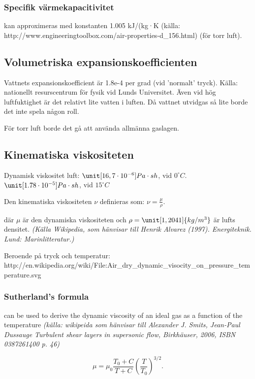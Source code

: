 \subsubsection{Specifik värmekapacitivitet}
kan approximeras med konstanten 1.005 kJ/(kg·K (källa: http://www.engineeringtoolbox.com/air-properties-d\_156.html) (för torr luft).

\subsection{Volumetriska expansionskoefficienten} %
Vattnets expansionskoefficient är 1.8e-4 per grad (vid 'normalt' tryck). Källa: nationellt resurscentrum för fysik vid Lunds Universitet. Även vid hög luftfuktighet är det relativt lite vatten i luften. Då vattnet utvidgas så lite borde det inte spela någon roll.

För torr luft borde det gå att använda allmänna gaslagen.

\subsection{Kinematiska viskositeten} %
Dynamisk viskositet luft: $\unit[16,7\cdot10^{-6}]{Pa\cdot sh}$, vid $0^\circ C$.
$\unit[1.78\cdot10^{-5}]{Pa\cdot sh}$, vid $15^\circ C$

Den kinematiska viskositeten $\nu$ definieras som: $\nu = \frac {\mu} {\rho}.$

där $\mu$ är den dynamiska viskositeten och $\rho=\unit[1,2041]{kg/m^3}$ är lufts densitet. \emph{(Källa Wikipedia, som hänvisar till Henrik Alvarez (1997). Energiteknik. Lund: Marinlitteratur.)}

Beroende på tryck och temperatur: http://en.wikipedia.org/wiki/File:Air\_dry\_dynamic\_visocity\_on\_pressure\_temperature.svg

\subsubsection{Sutherland's formula}
can be used to derive the dynamic viscosity of an ideal gas as a function of the temperature \emph{(källa: wikipeida som hänvisar till Alexander J. Smits, Jean-Paul Dussauge Turbulent shear layers in supersonic flow, Birkhäuser, 2006, ISBN 0387261400 p. 46)}

\begin{equation}
{\mu} = {\mu}_0 \frac {T_0+C} {T + C} \left (\frac {T} {T_0} \right )^{3/2}.
\end{equation}

